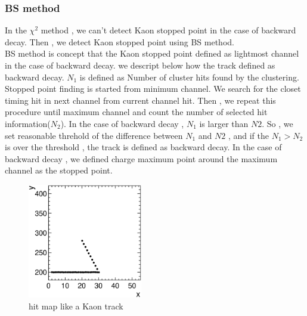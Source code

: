 \subsubsection{BS method}
In the $\chi^{2}$ method , we can't detect Kaon stopped point in the case of backward decay.
Then , we detect Kaon stopped point using BS method.\\ 
BS method is concept that the Kaon stopped point defined as lightmost channel in the case of backward decay.
we descript below how the track defined as backward decay.
$N_{1}$ is defined as Number of cluster hits found by the clustering.
Stopped point finding is started from minimum channel.
We search for the closet timing hit in next channel from current channel hit. 
Then , we repeat this procedure until maximum channel and count the number of selected hit information($N_{2}$).
In the case of backward decay , $N_{1}$ is larger than $N{2}$.
So , we set reasonable threhold of the difference between $N_{1}$ and $N{2}$ , and if the $N_{1}>N_{2}$ is over the threshold , the track is defined as backward decay.
In the case of backward decay , we defined charge maximum point around the maximum channel as the stopped point. 

\begin{figure}[!htb]
  \begin{center}
    \includegraphics[width=50mm]{fig/hmap_kink_BS.eps}
  \end{center}
  \caption{hit map like a Kaon track}
  \label{hmap_BS}
\end{figure}


